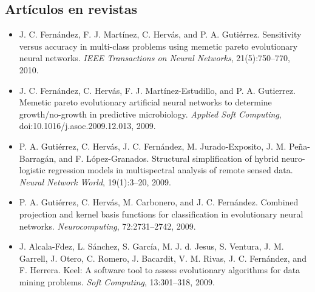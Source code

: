 \subsection{Artículos en revistas}
\begin{itemize}
	\item J. C. Fernández, F. J. Martínez, C. Hervás, and P. A. Gutiérrez. Sensitivity versus
accuracy in multi-class problems using memetic pareto evolutionary neural
			networks. \textit{IEEE Transactions on Neural Networks}, 21(5):750–770, 2010.
	\item J. C. Fernández, C. Hervás, F. J. Martínez-Estudillo, and P. A. Gutierrez. Memetic
			pareto evolutionary artificial neural networks to determine growth/no-growth in predictive
			microbiology. \textit{Applied Soft Computing}, doi:10.1016/j.asoc.2009.12.013, 2009.
	\item P. A. Gutiérrez, C. Hervás, J. C. Fernández, M. Jurado-Exposito, J. M. Peña-Barragán, and
			F. López-Granados. Structural simplification of hybrid neuro-logistic regression models in
			multispectral analysis of remote sensed data. \textit{ Neural Network World}, 19(1):3–20,
			2009.
	\item P. A. Gutiérrez, C. Hervás, M. Carbonero, and J. C. Fernández. Combined projection and
			kernel basis functions for classification in evolutionary neural
			networks. \textit{Neurocomputing}, 72:2731–2742, 2009.
	\item J. Alcala-Fdez, L. Sánchez, S. García, M. J. d. Jesus, S. Ventura, J. M. Garrell, J. Otero,
			C. Romero, J. Bacardit, V. M. Rivas, J. C. Fernández, and F. Herrera. Keel: A software tool
			to assess evolutionary algorithms for data mining problems. \textit{ Soft Computing},
			13:301–318,	2009.
\end{itemize}

